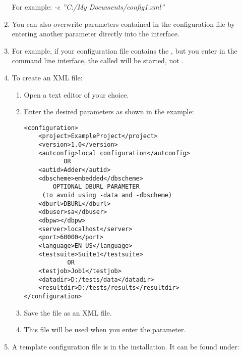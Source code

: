 \begin{enumerate}
For example:
\emph{-c ''C:/My Documents/config1.xml''}
\item You can also overwrite parameters contained in the configuration file by entering another parameter directly into the interface. 
\item For example, if your configuration file contains the \gdsuite{} , but you enter  in the command line interface, the \gdsuite{} called  will be started, not .
\item To create an XML file:
\begin{enumerate} 
\item Open a text editor of your choice. 
\item Enter the desired parameters as shown in the example:
\footnotesize
\begin{verbatim}
<configuration>
    <project>ExampleProject</project>
    <version>1.0</version>
    <autconfig>local configuration</autconfig>
           OR
    <autid>Adder</autid>
    <dbscheme>embedded</dbscheme>
        OPTIONAL DBURL PARAMETER 
     (to avoid using -data and -dbscheme)
    <dburl>DBURL</dburl>
    <dbuser>sa</dbuser>
    <dbpw></dbpw>
    <server>localhost</server>
    <port>60000</port>
    <language>EN_US</language>
    <testsuite>Suite1</testsuite>
            OR
    <testjob>Job1</testjob>        
    <datadir>D:/tests/data</datadir>
    <resultdir>D:/tests/results</resultdir>
</configuration>
\end{verbatim}
\normalsize
\item Save the file as an XML file.
\item This file will be used when you enter the  parameter.
\end{enumerate}
\item A template configuration file is in the installation. It can be found under:\\
\end{enumerate}
